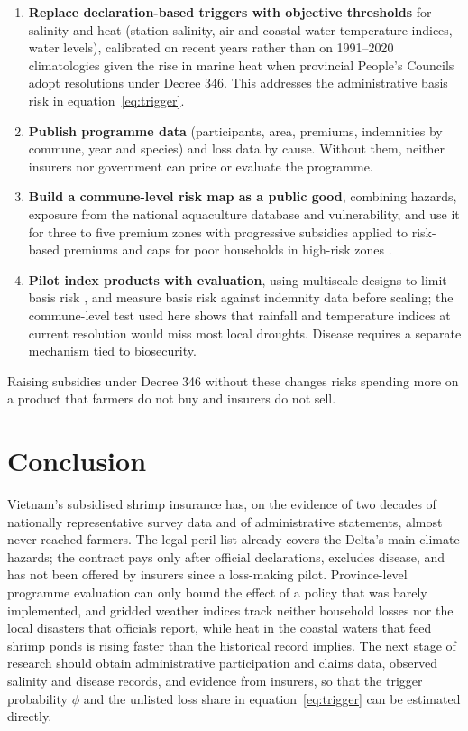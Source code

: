 \documentclass[11pt,a4paper]{article}
\begin{document}
\begin{enumerate}
\item \textbf{Replace declaration-based triggers with objective thresholds} for salinity and heat (station salinity, air and coastal-water temperature indices, water levels), calibrated on recent years rather than on 1991--2020 climatologies given the rise in marine heat when provincial People's Councils adopt resolutions under Decree 346. This addresses the administrative basis risk in equation~\eqref{eq:trigger}.
\item \textbf{Publish programme data} (participants, area, premiums, indemnities by commune, year and species) and loss data by cause. Without them, neither insurers nor government can price or evaluate the programme.
\item \textbf{Build a commune-level risk map as a public good}, combining hazards, exposure from the national aquaculture database \parencite{mae2026qd2120} and vulnerability, and use it for three to five premium zones with progressive subsidies applied to risk-based premiums and caps for poor households in high-risk zones \parencite{shirai2026drf,aguilar2018fao}.
\item \textbf{Pilot index products with evaluation}, using multiscale designs to limit basis risk \parencite{elabed2013}, and measure basis risk against indemnity data before scaling; the commune-level test used here shows that rainfall and temperature indices at current resolution would miss most local droughts. Disease requires a separate mechanism tied to biosecurity.
\end{enumerate}

Raising subsidies under Decree 346 without these changes risks spending more on a product that farmers do not buy and insurers do not sell.

\section{Conclusion}
\label{sec:conclusion}

Vietnam's subsidised shrimp insurance has, on the evidence of two decades of nationally representative survey data and of administrative statements, almost never reached farmers. The legal peril list already covers the Delta's main climate hazards; the contract pays only after official declarations, excludes disease, and has not been offered by insurers since a loss-making pilot. Province-level programme evaluation can only bound the effect of a policy that was barely implemented, and gridded weather indices track neither household losses nor the local disasters that officials report, while heat in the coastal waters that feed shrimp ponds is rising faster than the historical record implies. The next stage of research should obtain administrative participation and claims data, observed salinity and disease records, and evidence from insurers, so that the trigger probability $\phi$ and the unlisted loss share in equation~\eqref{eq:trigger} can be estimated directly.
\end{document}
